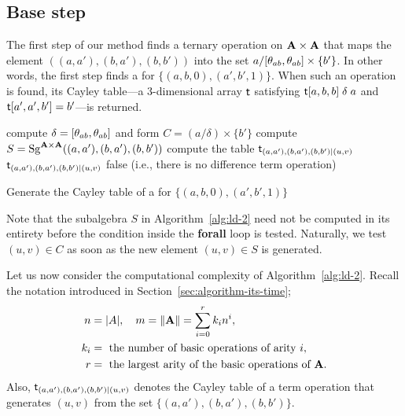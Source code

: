 \documentclass{ws-ijac}
\begin{document}
\newcommand{\tripzu}{\ensuremath{(a_0, b_0, 0), (a_1, b_1, 1)}}

\newcommand{\triptik}{\ensuremath{(a,a'),(b,a'),(b,b')}}
\newcommand{\pairtik}{\ensuremath{(a,b, 0), (a', b', 1)}}
\newcommand{\abb}{\ensuremath{(a, b, b)}}
\newcommand{\aabtik}{\ensuremath{(a', a', b')}}

\newcommand{\cabxbtik}{\ensuremath{a/\com{\theta_{ab}} \times \{b'\}}}
\subsection{Base step} %
\label{sec:cc-ld-2}
The first step of our method finds a ternary operation on
$\mathbf{A} \times \mathbf{A}$ that maps the element
$(\triptik)$ into the set
$\cabxbtik$. In other words, the first step finds a \ldto for
$\{\pairtik\}$.
When such an operation is found, its Cayley table---a
$3$-dimensional array $\mathsf{t}$ satisfying
$\mathsf{t}[a,b, b] \mathrel{\delta} a$ and  $\mathsf{t}[a',a',b'] = b'$---is
returned.

\begin{algorithm}%

  \KwIn{$S = \{\pairtik\}$}

  compute $\delta = [ \theta_{ab} ,  \theta_{ab} ]$ and form $C= (a/\delta) \times \{b'\}$\;
  compute $S=\Sg^{\alg{A}\times \alg{A}} (\triptik)$\;
   {
    compute the table $\sanst_{\triptik\mid (u,v)}$\;
     {
      \Return $\sanst_{\triptik \mid (u,v)}$\;
    }
  \Return false (i.e., there is no difference term operation)
  }

  \caption{Generate the Cayley table of a \ldto for $\{\pairtik \}$}
  \label{alg:ld-2}

\end{algorithm}
Note that the subalgebra $S$ in Algorithm~\ref{alg:ld-2}
need not be computed in its entirety before
the condition inside the {\bf forall} loop is tested.  Naturally, we test
$(u,v) \in C$ as soon as the new element $(u,v) \in S$ is generated.

Let us now consider the computational complexity of
Algorithm~\ref{alg:ld-2}.
Recall the notation introduced in Section~\ref{sec:algorithm-its-time};
\begin{align*}
  n &= |A|, \quad m=\|\mathbf{A}\| = \sum_{i=0}^r k_i n^i,\\
k_i&= \text{ the number of basic operations of arity~$i$},\\
r &= \text{ the largest arity of the basic operations of $\mathbf{A}$.}
\end{align*}
Also, $\sanst_{\triptik |(u,v)}$ denotes the Cayley table of a
term operation that generates $(u,v)$ from the set $\{\triptik \}$.
\end{document}
